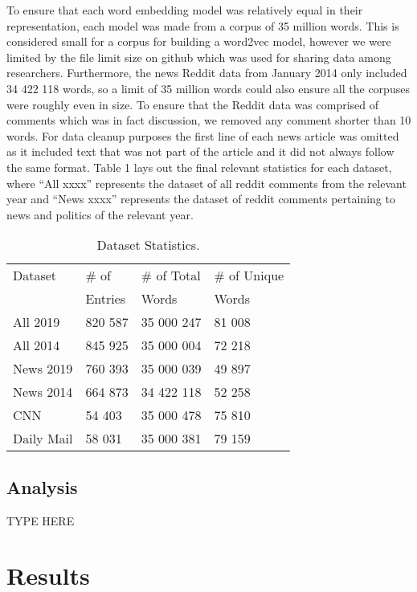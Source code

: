 \documentclass[10pt,letterpaper]{article}
\begin{document}
To ensure that each word embedding model was relatively equal in their representation, each model was made from a corpus of 35 million words. This is considered small for a corpus for building a word2vec model, however we were limited by the file limit size on github which was used for sharing data among researchers. Furthermore, the news Reddit data from January 2014 only included 34 422 118 words, so a limit of 35 million words could also ensure all the corpuses were roughly even in size. To ensure that the Reddit data was comprised of comments which was in fact discussion, we removed any comment shorter than 10 words. For data cleanup purposes the first line of each news article was omitted as it included text that was not part of the article and it did not always follow the same format. Table 1 lays out the final relevant statistics for each dataset, where “All xxxx” represents the dataset of all reddit comments from the relevant year and “News xxxx” represents the dataset of reddit comments pertaining to news and politics of the relevant year.

\begin{table}[H]
\begin{center} 
\caption{Dataset Statistics.} 
\label{dataset-stat} 
\vskip 0.12in
\begin{tabular}{llll} 
\hline
Dataset    & \# of    & \# of Total & \# of Unique \\
           &  Entries & Words       & Words        \\
\hline
All 2019   & 820 587  & 35 000 247  & 81 008       \\
All 2014   & 845 925  & 35 000 004  & 72 218       \\
News 2019  & 760 393  & 35 000 039  & 49 897       \\
News 2014  & 664 873  & 34 422 118  & 52 258       \\
CNN        & 54 403   & 35 000 478  & 75 810       \\
Daily Mail & 58 031   & 35 000 381  & 79 159       \\
\hline
\end{tabular} 
\end{center} 
\end{table}

\subsection{Analysis}

TYPE HERE

\section{Results}
\end{document}
